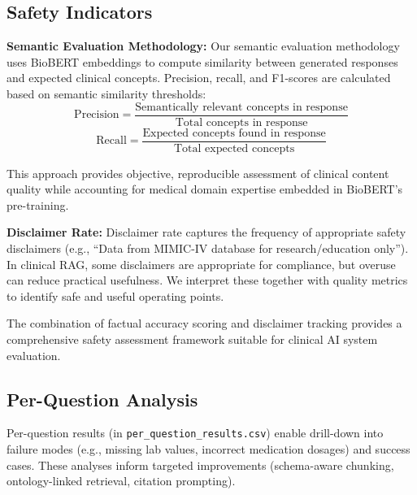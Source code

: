 \subsection{Safety Indicators}

\textbf{Semantic Evaluation Methodology:}
Our semantic evaluation methodology uses BioBERT embeddings to compute similarity between generated responses and expected clinical concepts. Precision, recall, and F1-scores are calculated based on semantic similarity thresholds:
\begin{equation}
\text{Precision} = \frac{\text{Semantically relevant concepts in response}}{\text{Total concepts in response}}
\end{equation}
\begin{equation}
\text{Recall} = \frac{\text{Expected concepts found in response}}{\text{Total expected concepts}}
\end{equation}

This approach provides objective, reproducible assessment of clinical content quality while accounting for medical domain expertise embedded in BioBERT's pre-training.

\textbf{Disclaimer Rate:}
Disclaimer rate captures the frequency of appropriate safety disclaimers (e.g., ``Data from MIMIC-IV database for research/education only''). In clinical RAG, some disclaimers are appropriate for compliance, but overuse can reduce practical usefulness. We interpret these together with quality metrics to identify safe and useful operating points.

The combination of factual accuracy scoring and disclaimer tracking provides a comprehensive safety assessment framework suitable for clinical AI system evaluation.

\subsection{Per-Question Analysis}
Per-question results (in \texttt{per\_question\_results.csv}) enable drill-down into failure modes (e.g., missing lab values, incorrect medication dosages) and success cases. These analyses inform targeted improvements (schema-aware chunking, ontology-linked retrieval, citation prompting).

